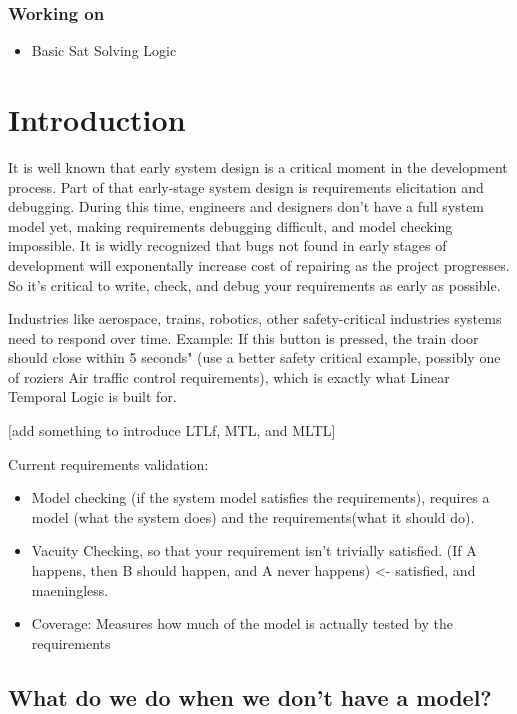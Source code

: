 \documentclass{article}
\begin{document}
\subsubsection{Working on}
\begin{itemize}
    \item Basic Sat Solving Logic
\end{itemize}


\section*{Introduction}
It is well known that early system design is a critical moment in the development process. Part of that early-stage system design is requirements elicitation and debugging. During this time, engineers and designers don't have a full system model yet, making requirements debugging difficult, and model checking impossible. It is widly recognized that bugs not found in early stages of development will exponentally increase cost of repairing as the project progresses. So it's critical to write, check, and debug your requirements as early as possible.

Industries like aerospace, trains, robotics, other safety-critical industries systems need to respond over time. Example: If this button is pressed, the train door should close within 5 seconds" (use a better safety critical example, possibly one of roziers Air traffic control requirements), which is exactly what Linear Temporal Logic is built for.

[add something to introduce LTLf, MTL, and MLTL]

Current requirements validation:
\begin{itemize}
    \item Model checking (if the system model satisfies the requirements), requires a model (what the system does) and the requirements(what it should do).
    \item Vacuity Checking, so that your requirement isn't trivially satisfied. (If A happens, then B should happen, and A never happens) <- satisfied, and maeningless.
    \item Coverage: Measures how much of the model is actually tested by the requirements
\end{itemize}

\subsection*{What do we do when we don't have a model?}
\end{document}
